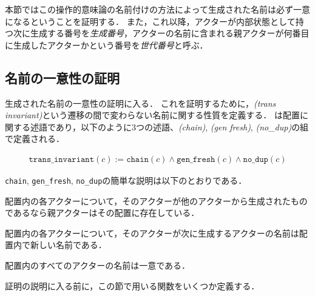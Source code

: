 本節ではこの操作的意味論の名前付けの方法によって生成された名前は必ず一意になるということを証明する．
また，これ以降，アクターが内部状態として持つ次に生成する番号を\emph{生成番号}，アクターの名前に含まれる親アクターが何番目に生成したアクターかという番号を\emph{世代番号}と呼ぶ．

\subsection{名前の一意性の証明}

生成された名前の一意性の証明に入る．
これを証明するために，\emph{\transinv(trans invariant)}という遷移の間で変わらない名前に関する性質を定義する．
\transinv は配置に関する述語であり，以下のように3つの述語、\emph{\chain (chain)}, \emph{\fresh (gen fresh)}, \emph{\nodup (no\_dup)}の組で定義される．

\begin{definition}{\transinv}
\begin{displaymath}
  \begin{array}{l}
    \texttt{trans\_invariant}(c) :=
    \texttt{chain}(c) \wedge \texttt{gen\_fresh}(c) \wedge \texttt{no\_dup}(c)
  \end{array}
\end{displaymath}
\end{definition}

\texttt{chain}, \texttt{gen\_fresh}, \texttt{no\_dup}の簡単な説明は以下のとおりである．

\begin{description}[style=nextline,leftmargin=12pt,parsep=0pt]
\item[\chain]
  配置内の各アクターについて，そのアクターが他のアクターから生成されたものであるなら親アクターはその配置に存在している．
\item[\fresh]
  配置内の各アクターについて，そのアクターが次に生成するアクターの名前は配置内で新しい名前である．
\item[\nodup]
  配置内のすべてのアクターの名前は一意である．
\end{description}

証明の説明に入る前に，この節で用いる関数をいくつか定義する．


